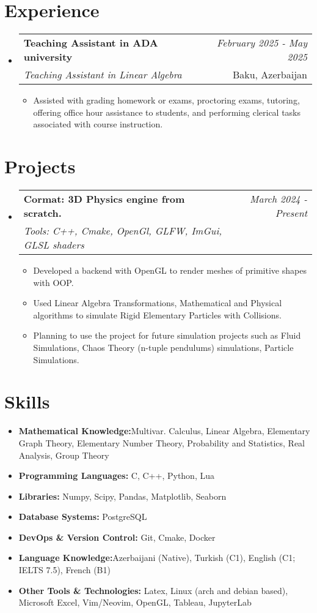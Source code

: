 \documentclass[a4paper,11pt]{article}
\makeatletter
\newcommand{\resumeItem}[2]{
\item{
        \textbf{#1}{\hspace{0.5mm}#2 \vspace{-0.5mm}}
    }
}
\newcommand{\resumeSubheading}[4]{
    \vspace{0.5mm}
\item
    \begin{tabular*}{0.98\textwidth}[t]{l@{\extracolsep{\fill}}r}
        \textbf{#1} & \textit{\footnotesize{#4}} \\
        \textit{\footnotesize{#3}} &  \footnotesize{#2}\\
    \end{tabular*}
    \vspace{-2.4mm}
}
\newcommand{\resumeProject}[4]{
    \vspace{0.5mm}
\item
    \begin{tabular*}{0.98\textwidth}[t]{l@{\extracolsep{\fill}}r}
        \textbf{#1} & \textit{\footnotesize{#3}} \\
        \footnotesize{\textit{#2}} & \footnotesize{#4}
    \end{tabular*}
    \vspace{-2.4mm}
}
\newcommand{\resumeSubItem}[2]{\resumeItem{#1}{#2}\vspace{-4pt}}
\newcommand{\resumeSubHeadingListStart}{
\begin{itemize}[leftmargin=*,labelsep=1mm]}
\newcommand{\resumeHeadingSkillStart}{
        \begin{itemize}[leftmargin=*,itemsep=1.7mm, rightmargin=2ex]}
\newcommand{\resumeItemListStart}{
                \begin{itemize}[leftmargin=*,labelsep=1mm,itemsep=0.5mm]}
\newcommand{\resumeSubHeadingListEnd}{
                    \end{itemize}\vspace{2mm}}
\newcommand{\resumeHeadingSkillEnd}{
            \end{itemize}\vspace{-2mm}}
\newcommand{\resumeItemListEnd}{
    \end{itemize}\vspace{-2mm}}
\makeatother
\begin{document}
\section{\textbf{Experience}}
\vspace{-0.4mm}
\resumeSubHeadingListStart
\resumeSubheading
{{Teaching Assistant in ADA university }}{Baku, Azerbaijan}
{Teaching Assistant in Linear Algebra}{February 2025 - May 2025}
\resumeItemListStart
\item Assisted with
grading homework or exams, proctoring exams, tutoring, offering office hour assistance to students,
and performing clerical tasks associated with course instruction.
\resumeItemListEnd
\resumeSubHeadingListEnd
\vspace{-6mm}

\section{\textbf{Projects}}
\vspace{-0.4mm}
\resumeSubHeadingListStart
\resumeProject
{Cormat: 3D Physics engine from scratch.}
{Tools: C++, Cmake, OpenGl, GLFW, ImGui, GLSL shaders}
{March 2024 - Present}
{{}\href{https://github.com/JosephMehdiyev/cormat}{\textcolor{darkblue}{\faGithub}}}
\resumeItemListStart
\item Developed a backend with OpenGL to render meshes of primitive shapes with OOP.
\item Used Linear Algebra Transformations, Mathematical and Physical algorithms to simulate Rigid Elementary Particles with Collisions.
\item Planning to use the project for future simulation projects such as Fluid Simulations, Chaos Theory (n-tuple pendulums) simulations,
Particle Simulations.
\resumeItemListEnd
\resumeSubHeadingListEnd
\vspace{-6mm}

\section{\textbf{Skills}}
\vspace{-0.4mm}
\resumeHeadingSkillStart
\resumeSubItem{Mathematical Knowledge:}
{Multivar. Calculus, Linear Algebra, Elementary Graph Theory, Elementary Number Theory, Probability and Statistics, Real Analysis, Group Theory}
\resumeSubItem{Programming Languages:}
{ C, C++, Python, Lua}
\resumeSubItem{Libraries:}
{ Numpy, Scipy, Pandas, Matplotlib, Seaborn}
\resumeSubItem{Database Systems:}
{ PostgreSQL}
\resumeSubItem{DevOps \& Version Control:}
{ Git, Cmake, Docker }
\resumeSubItem{Language Knowledge:}
{Azerbaijani (Native), Turkish (C1), English (C1; IELTS 7.5), French (B1)}
\resumeSubItem{Other Tools \& Technologies:}
{ Latex, Linux (arch and debian based), Microsoft Excel, Vim/Neovim, OpenGL, Tableau, JupyterLab}
\resumeHeadingSkillEnd
\end{document}
